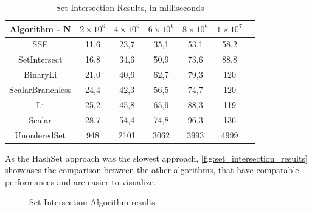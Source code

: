\begin{table}[!ht]
  \begin{center}
    \caption{Set Intersection Results, in milliseconds}\label{tab:setresults}
    \begin{tabular}{|c|c|c|c|c|c|c|}
      \hline
      \textbf{Algorithm - N} & \bfseries $2\times10^6$ & \bfseries $4\times10^6$ & \bfseries $6\times10^6$ & \bfseries $8\times10^6$ & \bfseries $1\times10^7$\\
      \hline
      SSE & 11,6 & 23,7 & 35,1 & 53,1 & 58,2 \\
      \hline
      SetIntersect & 16,8 & 34,6 & 50,9 & 73,6 & 88,8 \\
      \hline
      BinaryLi & 21,0 & 40,6 & 62,7 & 79,3 & 120\\
      \hline
      ScalarBranchless & 24,4 & 42,3 & 56,5 & 74,7 & 120\\
      \hline
      Li & 25,2 & 45,8 & 65,9 & 88,3 & 119\\
      \hline
      Scalar & 28,7 & 54,4 & 74,8 & 96,3 & 136 \\
      \hline
      UnorderedSet & 948 & 2101 & 3062 & 3993 & 4999\\
      \hline
    \end{tabular}
  \end{center}
\end{table}

As the HashSet approach was the slowest approach, \autoref{fig:set_intersection_results} showcases the comparison between the other algorithms, that have comparable performances and are easier to visualize.

\begin{figure}[ht]
  \caption{Set Intersection Algorithm results}\label{fig:set_intersection_results}
  \vspace{6mm}
  \begin{center}
  \end{center}
  \vspace{2mm}
\end{figure}

